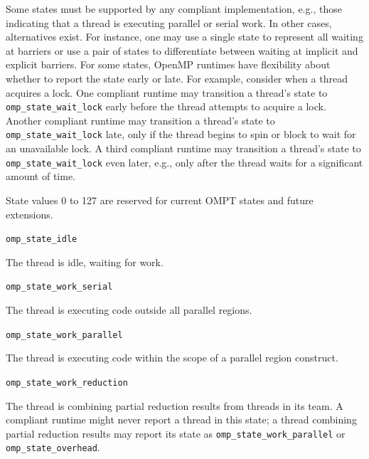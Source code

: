 \documentclass{article}
\newcommand{\descheader}[1]{{\needspace{3\baselineskip}\vspace{1em}\noindent \fbox{#1}}}
\begin{document}
Some states must be supported by any compliant implementation, e.g., those indicating that a thread is executing parallel or serial work. In other cases, alternatives exist. For instance, one may use a single state to represent all waiting at barriers or use a pair of states to differentiate between waiting at implicit and explicit barriers.
For some states, OpenMP runtimes have flexibility about whether to report the state early or late.
For example, consider when a thread acquires a lock. One
compliant runtime may transition a thread's state to 
\verb|omp_state_wait_lock|  early before the thread attempts to acquire a
lock. Another compliant runtime may transition a thread's state to
\verb|omp_state_wait_lock| late, only if the thread begins to spin or
block to wait for an unavailable lock. A third compliant runtime
may transition a thread's state to \verb|omp_state_wait_lock| even later, e.g., only
after the thread waits for a significant amount of time. 

State values 0 to 127 are reserved for current OMPT states and future extensions.  

\descheader{Idle State}

\begin{description}
\item \verb|omp_state_idle| 

  The thread is idle, waiting for work.
\end{description}

\descheader{Work States}

\begin{description}

\item \verb|omp_state_work_serial| 

  The thread is executing code outside all parallel regions. 

\item \verb|omp_state_work_parallel| 

  The thread is executing code within the scope of a parallel region construct.

\sloppy
\item \verb|omp_state_work_reduction| 
 
  The thread is combining partial reduction results from threads in its team. A compliant
  runtime might never report a thread in this state; a thread
  combining partial reduction results may  report its state as
  \verb|omp_state_work_parallel| or \verb|omp_state_overhead|.

\end{description}
\end{document}
